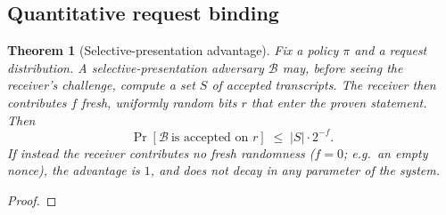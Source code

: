 \documentclass[journal]{IEEEtran}
\newtheorem{theorem}{Theorem}
\newcommand{\need}[1]{}
\newcommand{\need}[1]{\textcolor{blue}{[[ NEED: #1 ]]}}
\begin{document}
\need{This proposition is the paper's cheapest experiment and its strongest
anchor for Theorem \ref{thm:t1}---it is measurable in a day, and it makes the
bound concrete rather than cited. Source: \texttt{docs/design-semantic-rules.md}
lines 195--201, where the repository itself already names it as a second
instance.}

\subsection{Quantitative request binding}
\label{sec:t3}

\begin{theorem}[Selective-presentation advantage]
\label{thm:t3}
Fix a policy $\pi$ and a request distribution. A selective-presentation
adversary $\mathcal{B}$ may, \emph{before} seeing the receiver's challenge,
compute a set $S$ of accepted transcripts. The receiver then contributes $f$
fresh, uniformly random bits $r$ that enter the proven statement. Then
\[
\Pr\!\left[\mathcal{B}\ \text{is accepted on } r\right] \;\le\; |S| \cdot 2^{-f}.
\]
If instead the receiver contributes no fresh randomness ($f = 0$; e.g.\ an
empty nonce), the advantage is $1$, and \emph{does not decay in any parameter
of the system}.
\end{theorem}
\begin{proof}
\need{主论证：$r$ 进入 $b = H(\text{dom} \| r \| T)$，故 $S$ 里任何一个
预先算好的证书，只有在 $r$ 恰好落进它已覆盖的挑战集合时才被接受；
$f$ 个新鲜均匀比特给出 $2^{-f}$ 的对撞上界，再对 $S$ 取并界。
$f = 0$ 时 $S$ 中每个元素都是永久有效的重放。}

\need{\textbf{代码依据}：\texttt{circuits/types/src/lib.rs}:950--995 已写明
“nonce 为空是合法的……不提供任何重放防护”。定理的 $f = 0$ 分支不是假想，
是本系统当前 API 的\emph{合法输入}。}
\end{proof}

\need{这条定理与 Theorem \ref{thm:t1} \textbf{同构}，而正是这一点使它值得写：
两条说的是同一件事——\emph{一个证明只能绑住提交进去的、对手无法预先选择的
那部分比特所能支撑的量}。Theorem \ref{thm:t1} 管响应侧
（$k = -\log_2 \mathsf{Guess}(T \mid Z)$，见 Definition \ref{def:k}），Theorem \ref{thm:t3} 管请求侧（新鲜度 $f$）。
这条统一主线写在 \S\ref{sec:intro} 的贡献列表里，是全文的理论骨架。}
\end{document}
